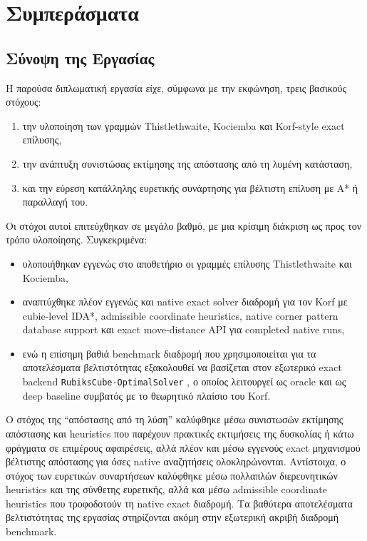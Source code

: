 \chapter{Συμπεράσματα}
\label{ch:conclusions}

\section{Σύνοψη της Εργασίας}

Η παρούσα διπλωματική εργασία είχε, σύμφωνα με την εκφώνηση, τρεις βασικούς
στόχους:
\begin{enumerate}
    \item την υλοποίηση των γραμμών Thistlethwaite, Kociemba και Korf-style exact επίλυσης,
    \item την ανάπτυξη συνιστώσας εκτίμησης της απόστασης από τη λυμένη κατάσταση,
    \item και την εύρεση κατάλληλης ευρετικής συνάρτησης για βέλτιστη επίλυση με A* ή παραλλαγή του.
\end{enumerate}

Οι στόχοι αυτοί επιτεύχθηκαν σε μεγάλο βαθμό, με μια κρίσιμη διάκριση ως προς τον
τρόπο υλοποίησης. Συγκεκριμένα:
\begin{itemize}
    \item υλοποιήθηκαν εγγενώς στο αποθετήριο οι γραμμές επίλυσης Thistlethwaite και Kociemba,
    \item αναπτύχθηκε πλέον εγγενώς και native exact solver διαδρομή για τον Korf με cubie-level IDA*, admissible coordinate heuristics, native corner pattern database support και exact move-distance API για completed native runs,
    \item ενώ η επίσημη βαθιά benchmark διαδρομή που χρησιμοποιείται για τα αποτελέσματα βελτιστότητας εξακολουθεί να βασίζεται στον εξωτερικό exact backend \texttt{RubiksCube-OptimalSolver} \cite{kociemba_rubiks_optimal}, ο οποίος λειτουργεί ως oracle και ως deep baseline συμβατός με το θεωρητικό πλαίσιο του Korf.
\end{itemize}

Ο στόχος της ``απόστασης από τη λύση'' καλύφθηκε μέσω συνιστωσών εκτίμησης
απόστασης και heuristics που παρέχουν πρακτικές εκτιμήσεις της δυσκολίας ή
κάτω φράγματα σε επιμέρους αφαιρέσεις, αλλά πλέον και μέσω εγγενούς exact
μηχανισμού βέλτιστης απόστασης για όσες native αναζητήσεις ολοκληρώνονται.
Αντίστοιχα, ο στόχος των ευρετικών
συναρτήσεων καλύφθηκε μέσω πολλαπλών διερευνητικών heuristics και της σύνθετης
ευρετικής, αλλά και μέσω admissible coordinate heuristics που τροφοδοτούν τη
native exact διαδρομή. Τα βαθύτερα αποτελέσματα βελτιστότητας της εργασίας
στηρίζονται ακόμη στην εξωτερική ακριβή διαδρομή benchmark.

